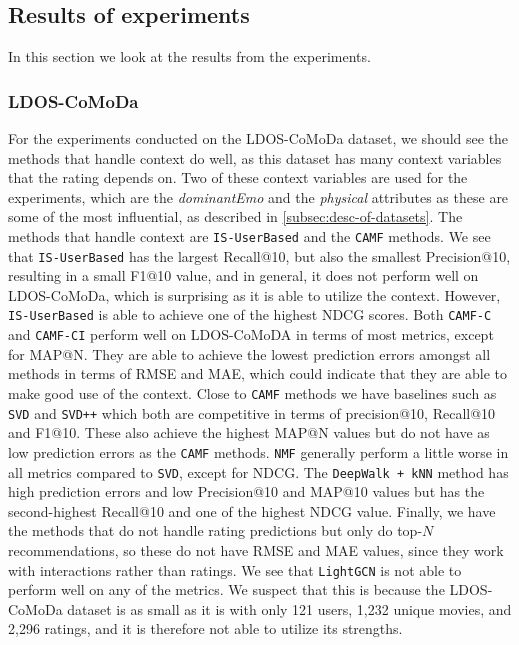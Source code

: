 \subsection{Results of experiments}\label{subsec:resultsofexperiment}
In this section we look at the results from the experiments.
\subsubsection{LDOS-CoMoDa}
For the experiments conducted on the LDOS-CoMoDa dataset, we should see the methods that handle context do well, as this dataset has many context variables that the rating depends on.
Two of these context variables are used for the experiments, which are the \textit{dominantEmo} and the \textit{physical} attributes as these are some of the most influential, as described in \autoref{subsec:desc-of-datasets}.
The methods that handle context are \texttt{IS-UserBased} and the \texttt{CAMF} methods.
We see that \texttt{IS-UserBased} has the largest Recall@10, but also the smallest Precision@10, resulting in a small F1@10 value, and in general, it does not perform well on LDOS-CoMoDa, which is surprising as it is able to utilize the context.
However, \texttt{IS-UserBased} is able to achieve one of the highest NDCG scores.
Both \texttt{CAMF-C} and \texttt{CAMF-CI} perform well on LDOS-CoMoDA in terms of most metrics, except for MAP@N.
They are able to achieve the lowest prediction errors amongst all methods in terms of RMSE and MAE, which could indicate that they are able to make good use of the context.
Close to \texttt{CAMF} methods we have baselines such as \texttt{SVD} and \texttt{SVD++} which both are competitive in terms of precision@10, Recall@10 and F1@10. 
These also achieve the highest MAP@N values but do not have as low prediction errors as the \texttt{CAMF} methods.
\texttt{NMF} generally perform a little worse in all metrics compared to \texttt{SVD}, except for NDCG.
The \texttt{DeepWalk + kNN} method has high prediction errors and low Precision@10 and MAP@10 values but has the second-highest Recall@10 and one of the highest NDCG value.
Finally, we have the methods that do not handle rating predictions but only do top-$N$ recommendations, so these do not have RMSE and MAE values, since they work with interactions rather than ratings.
We see that \texttt{LightGCN} is not able to perform well on any of the metrics.
We suspect that this is because the LDOS-CoMoDa dataset is as small as it is with only 121 users, 1,232 unique movies, and 2,296 ratings, and it is therefore not able to utilize its strengths.

